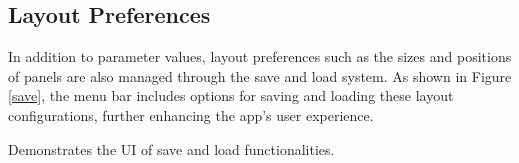 \subsection{Layout Preferences}

In addition to parameter values, layout preferences such as the sizes and positions of panels are also managed through the save and load system. As shown in Figure \ref{save}, the menu bar includes options for saving and loading these layout configurations, further enhancing the app’s user experience.

{Demonstrates the UI of save and load functionalities.}
